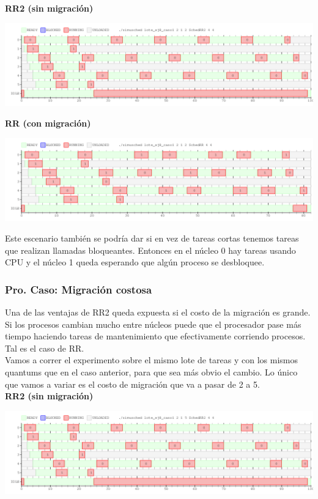 \textbf{RR2 (sin migración)}
\begin{center}
 \includegraphics[scale=0.48]{./RR2/caso1RR2.png}
\end{center}

\textbf{RR (con migración)}
\begin{center}
 \includegraphics[scale=0.48]{./RR2/caso1RR.png}
\end{center}

Este escenario también se podría dar si en vez de tareas cortas tenemos tareas que realizan llamadas bloqueantes.
Entonces en el núcleo 0 hay tareas usando CPU y el núcleo 1 queda esperando que algún proceso se desbloquee.\\

\subsubsection{Pro. Caso: Migración costosa}
Una de las ventajas de RR2 queda expuesta si el costo de la migración es grande.
Si los procesos cambian mucho entre núcleos puede que 
el procesador pase más tiempo haciendo tareas de mantenimiento que efectivamente corriendo procesos. 
Tal es el caso de RR.\\

Vamos a correr el experimento sobre el mismo lote de tareas y con los mismos
quantums que en el caso anterior, para que sea más obvio el cambio. Lo único
que vamos a variar es el costo de migración que va a pasar de 2 a 5.\\

\textbf{RR2 (sin migración)}
\begin{center}
 \includegraphics[scale=0.48]{./RR2/caso2RR2.png}
\end{center}

